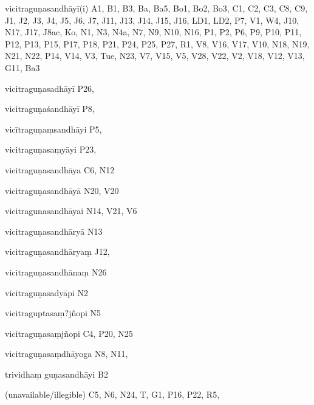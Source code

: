 \begin{marma}[hp02_009]
\begin{marma}[hp02_011]
 \begin{marma}[hp02_023c]
\item[vicitraguṇasandhāyī(i)] A1, B1, B3, Ba, Ba5, Bo1, Bo2, Bo3, C1, C2, C3, C8, C9, J1, J2, J3, J4, J5, J6, J7, J11, J13, J14, J15, J16, LD1, LD2, P7, V1, W4, J10, N17, J17, J8ac, Ko, N1, N3, N4a, N7, N9, N10, N16, P1, P2, P6, P9, P10, P11, P12, P13, P15, P17, P18, P21, P24, P25, P27, R1, V8, V16, V17, V10, N18, N19, N21, N22, P14, V14, V3, Tue, N23, V7, V15, V5, V28, V22, V2, V18, V12, V13, G11, Ba3
\item[vicitraguṇasadhāyī] P26,
\item[vicitraguṇaśandhāyī]  P8, 
\item[vicītraguṇaṃsandhāyi] P5, 
\item[vicitraguṇasaṃyāyi] P23,
\item[vicitraguṇasandhāya]  C6, N12
\item[vicitraguṇasandhāyā] N20, V20
\item[vicitragunasandhāyai]  N14, V21, V6
\item[vicitraguṇasandhāryā]  N13
\item[vicitraguṇasandhāryaṃ]  J12,
\item[vicitraguṇasandhānaṃ] N26
\item[vicitraguṇasadyāpi] N2
\item[vicitraguptasaṃ?jñopi] N5
\item[vicitraguṇasaṃjñopi] C4, P20, N25
\item[vicitraguṇasaṃdhāyoga]  N8, N11,
\item[trividhaṃ guṇasandhāyi] B2
\item[(unavailable/illegible)] C5, N6, N24, T, G1, P16, P22, R5,
  \begin{description}

    \end{description}
 \end{marma}



\end{marma}
\end{marma}
